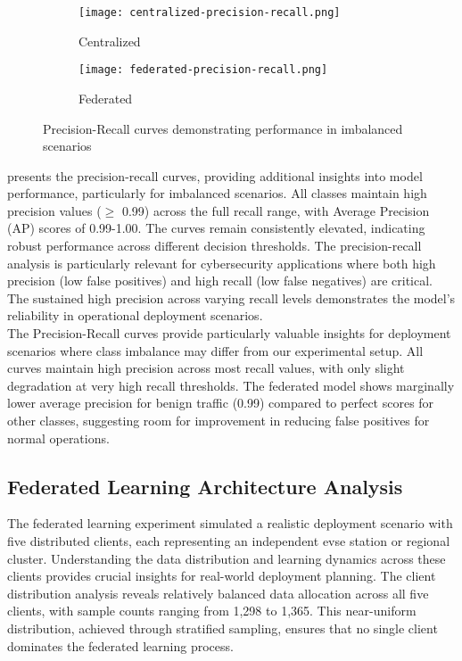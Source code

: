 \begin{figure}[H]
	\centering
	\begin{subfigure}[b]{0.45\textwidth}
		\centering
		\texttt{[image: centralized-precision-recall.png]}
		\caption{Centralized}
		\label{fig:pr-fed-detailed}
	\end{subfigure}
	\hspace{0.15cm} 
	\begin{subfigure}[b]{0.45\textwidth}
		\centering
		\texttt{[image: federated-precision-recall.png]}
		\caption{Federated}
		\label{fig:pr-cent-detailed}
	\end{subfigure}
	\caption{Precision-Recall curves demonstrating performance in imbalanced scenarios}
	\label{figure:precision-recall}
\end{figure}

 presents the precision-recall curves, providing additional insights into model performance, particularly for imbalanced scenarios. All classes maintain high precision values ($\geq$ 0.99) across the full recall range, with Average Precision (AP) scores of 0.99-1.00. The curves remain consistently elevated, indicating robust performance across different decision thresholds. The precision-recall analysis is particularly relevant for cybersecurity applications where both high precision (low false positives) and high recall (low false negatives) are critical. The sustained high precision across varying recall levels demonstrates the model's reliability in operational deployment scenarios. \\

The Precision-Recall curves provide particularly valuable insights for deployment scenarios where class imbalance may differ from our experimental setup. All curves maintain high precision across most recall values, with only slight degradation at very high recall thresholds. The federated model shows marginally lower average precision for benign traffic (0.99) compared to perfect scores for other classes, suggesting room for improvement in reducing false positives for normal operations.

\newpage
\subsection{Federated Learning Architecture Analysis}
The federated learning experiment simulated a realistic deployment scenario with five distributed clients, each representing an independent \gls{evse} station or regional cluster. Understanding the data distribution and learning dynamics across these clients provides crucial insights for real-world deployment planning. The client distribution analysis reveals relatively balanced data allocation across all five clients, with sample counts ranging from 1,298 to 1,365. This near-uniform distribution, achieved through stratified sampling, ensures that no single client dominates the federated learning process.

